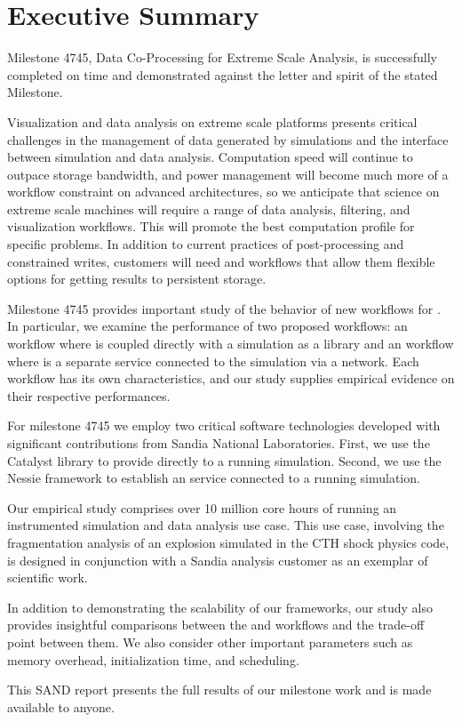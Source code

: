 \section*{Executive Summary}

Milestone 4745, Data Co-Processing for Extreme Scale Analysis, is
successfully completed on time and demonstrated against the letter and
spirit of the stated Milestone.

Visualization and data analysis on extreme scale platforms presents
critical challenges in the management of data generated by simulations and
the interface between simulation and data analysis.  Computation speed will
continue to outpace storage bandwidth, and power management will become
much more of a workflow constraint on advanced architectures, so we
anticipate that science on extreme scale machines will require a range of
data analysis, filtering, and visualization workflows.  This will promote
the best computation profile for specific problems.  In addition to current
practices of post-processing and constrained writes, customers will need
\insitu and \intransit workflows that allow them flexible options for
getting results to persistent storage.

Milestone 4745 provides important study of the behavior of new workflows
for \vda.  In particular, we examine the performance of two proposed
workflows: an \insitu workflow where \vda is coupled directly with a
simulation as a library and an \intransit workflow where \vda is a separate
service connected to the simulation via a network.  Each workflow has its
own characteristics, and our study supplies empirical evidence on their
respective performances.

For milestone 4745 we employ two critical software technologies developed
with significant contributions from Sandia National Laboratories.  First,
we use the Catalyst library to provide \insitu \vda directly to a running
simulation.  Second, we use the Nessie framework to establish an \intransit
\vda service connected to a running simulation.

Our empirical study comprises over 10 million core hours of running an
instrumented simulation and data analysis use case.  This use case, involving
the fragmentation analysis of an explosion simulated in the CTH shock
physics code, is designed in conjunction with a Sandia analysis customer as
an exemplar of scientific work.

In addition to demonstrating the scalability of our frameworks, our study
also provides insightful comparisons between the \insitu and \intransit
workflows and the trade-off point between them.  We also consider other
important parameters such as memory overhead, initialization time, and
scheduling.

This SAND report presents the full results of our milestone work and is
made available to anyone.
